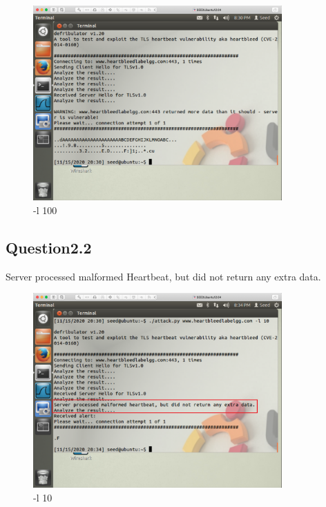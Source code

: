 \documentclass[onecolumn,oneside]{SUSTechHomework}
\begin{document}
\begin{figure}[H]
  \centering
  \includegraphics[width=0.85\textwidth]{img/p5.png}
  \caption{-l 100}
\end{figure}

\subsection*{Question2.2}

Server processed malformed Heartbeat, but did not return any extra data.

\begin{figure}[H]
  \centering
  \includegraphics[width=0.85\textwidth]{img/p6.png}
  \caption{-l 10}
\end{figure}
\end{document}
